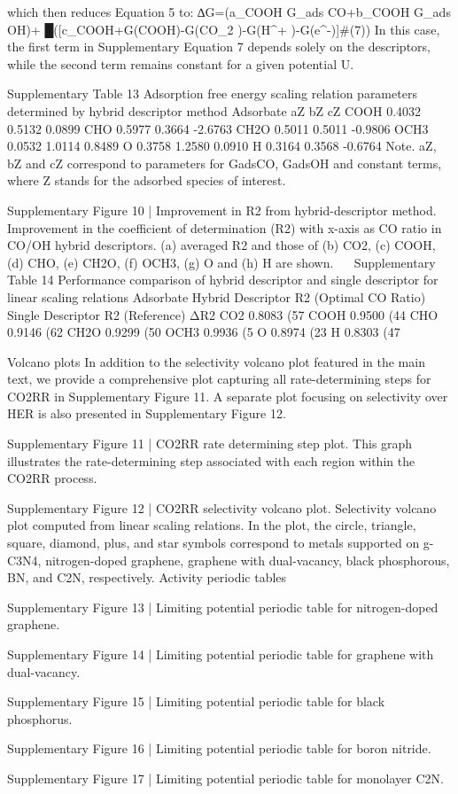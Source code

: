 which then reduces Equation 5 to:
∆G=(a_COOH G_ads CO+b_COOH G_ads OH)+
█([c_COOH+G(COOH)-G(CO_2 )-G(H^+ )-G(e^-)]#(7))
In this case, the first term in Supplementary Equation 7 depends solely on the descriptors, while the second term remains constant for a given potential U.


Supplementary Table 13
Adsorption free energy scaling relation parameters determined by hybrid descriptor method
Adsorbate	aZ	bZ	cZ
COOH	0.4032	0.5132	0.0899
CHO	0.5977	0.3664	-2.6763
CH2O	0.5011	0.5011	-0.9806
OCH3	0.0532	1.0114	0.8489
O	0.3758	1.2580	0.0910
H	0.3164	0.3568	-0.6764
Note. aZ, bZ and cZ correspond to parameters for GadsCO, GadsOH and constant terms, where Z stands for the adsorbed species of interest.



Supplementary Figure 10 | Improvement in R2 from hybrid-descriptor method. Improvement in the coefficient of determination (R2) with x-axis as CO ratio in CO/OH hybrid descriptors. (a) averaged R2 and those of (b) CO2, (c) COOH, (d) CHO, (e) CH2O, (f) OCH3, (g) O and (h) H are shown.
 
Supplementary Table 14
Performance comparison of hybrid descriptor and single descriptor for linear scaling relations
Adsorbate	Hybrid Descriptor R2
(Optimal CO Ratio)	Single Descriptor R2
(Reference)	ΔR2
CO2	0.8083 (57 %
COOH	0.9500 (44 %
CHO	0.9146 (62 %
CH2O	0.9299 (50 %
OCH3	0.9936 (5 %
O	0.8974 (23 %
H	0.8303 (47 %



Volcano plots
In addition to the selectivity volcano plot featured in the main text, we provide a comprehensive plot capturing all rate-determining steps for CO2RR in Supplementary Figure 11. A separate plot focusing on selectivity over HER is also presented in Supplementary Figure 12.


Supplementary Figure 11 | CO2RR rate determining step plot. This graph illustrates the rate-determining step associated with each region within the CO2RR process.


Supplementary Figure 12 | CO2RR selectivity volcano plot. Selectivity volcano plot computed from linear scaling relations. In the plot, the circle, triangle, square, diamond, plus, and star symbols correspond to metals supported on g-C3N4, nitrogen-doped graphene, graphene with dual-vacancy, black phosphorous, BN, and C2N, respectively.
Activity periodic tables


Supplementary Figure 13 | Limiting potential periodic table for nitrogen-doped graphene.


Supplementary Figure 14 | Limiting potential periodic table for graphene with dual-vacancy.



Supplementary Figure 15 | Limiting potential periodic table for black phosphorus.



Supplementary Figure 16 | Limiting potential periodic table for boron nitride.



Supplementary Figure 17 | Limiting potential periodic table for monolayer C2N.
